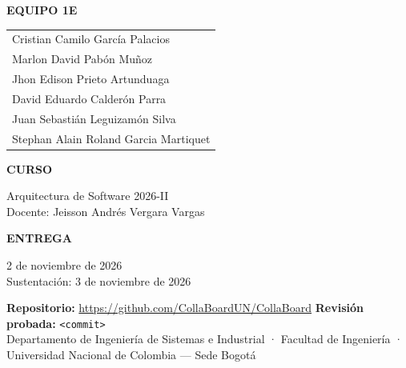 \begin{titlepage}
\vspace{1.4cm}

\begin{minipage}[t]{0.56\textwidth}
  {\sffamily\small\bfseries\color{cbIndigo} EQUIPO 1E}\par\vspace{0.4em}
  \begin{tabular}{@{}l@{}}
    Cristian Camilo García Palacios\\
    Marlon David Pabón Muñoz\\
    Jhon Edison Prieto Artunduaga\\
    David Eduardo Calderón Parra\\
    Juan Sebastián Leguizamón Silva\\
    Stephan Alain Roland Garcia Martiquet
  \end{tabular}
\end{minipage}\hfill
\begin{minipage}[t]{0.38\textwidth}
  {\sffamily\small\bfseries\color{cbIndigo} CURSO}\par\vspace{0.4em}
  Arquitectura de Software 2026-II\\
  Docente: Jeisson Andrés Vergara Vargas\par\vspace{1em}
  {\sffamily\small\bfseries\color{cbIndigo} ENTREGA}\par\vspace{0.4em}
  2 de noviembre de 2026\\
  Sustentación: 3 de noviembre de 2026
\end{minipage}

\vfill

\begin{tcolorbox}[enhanced,colback=cbGray,boxrule=0pt,arc=4pt,left=12pt,right=12pt,top=9pt,bottom=9pt]
  \small\color{cbMuted}
  \textbf{\color{cbInk}Repositorio:} \url{https://github.com/CollaBoardUN/CollaBoard}\hfill
  \textbf{\color{cbInk}Revisión probada:} \texttt{<commit>}\\[2pt]
  Departamento de Ingeniería de Sistemas e Industrial · Facultad de Ingeniería ·
  Universidad Nacional de Colombia — Sede Bogotá
\end{tcolorbox}
\end{titlepage}
